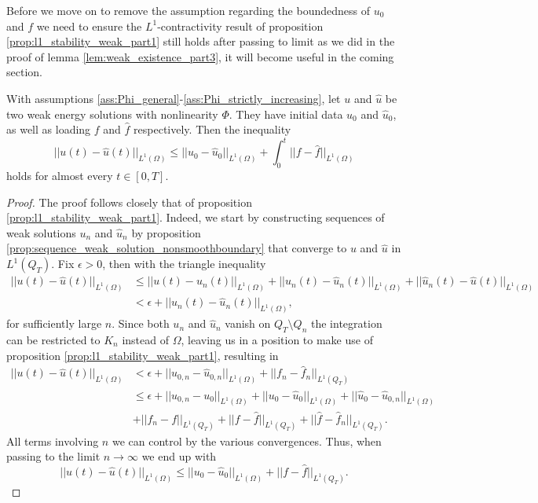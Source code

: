 \documentclass[11pt, a4paper]{article}
\begin{document}
Before we move on to remove the assumption regarding the boundedness of $u_0$ and $f$ we need to ensure the $L^1$-contractivity result of proposition \ref{prop:l1_stability_weak_part1} still holds after passing to limit as we did in the proof of lemma \ref{lem:weak_existence_part3}, it will become useful in the coming section.

\begin{proposition}
\label{prop:l1_stability_weak_part2}
With assumptions \ref{ass:Phi_general}-\ref{ass:Phi_strictly_increasing},  let $u$ and $\hat{u}$ be two weak energy solutions with nonlinearity $\Phi$. They have initial data $u_0$ and $\hat{u}_0$, as well as loading $f$ and $\hat{f}$ respectively. Then the inequality
\begin{equation}
||u(t) - \hat{u}(t)||_{L^1(\Omega)} \leq ||u_0 - \hat{u}_0||_{L^1(\Omega)} + \int_0^t||f-\hat{f}||_{L^1(\Omega)}
\end{equation}
holds for almost every $t\in [0,T]$.
\end{proposition}

\begin{proof}
The proof follows closely that of proposition \ref{prop:l1_stability_weak_part1}. Indeed, we start by constructing sequences of weak solutions $u_n$ and $\hat{u}_n$ by proposition \ref{prop:sequence_weak_solution_nonsmoothboundary} that converge to $u$ and $\hat{u}$ in $L^1(Q_T)$. Fix $\epsilon > 0$, then with the triangle inequality
\begin{align*}
||u(t) - \hat{u}(t)||_{L^1(\Omega)} &\leq ||u(t) - u_n(t)||_{L^1(\Omega)} + ||u_n(t) - \hat{u}_n(t)||_{L^1(\Omega)} + ||\hat{u}_n(t) - \hat{u}(t)||_{L^1(\Omega)} \\
&< \epsilon + ||u_n(t) - \hat{u}_n(t)||_{L^1(\Omega)},
\end{align*}
for sufficiently large $n$. Since both $u_n$ and $\hat{u}_n$ vanish on $Q_T\setminus Q_n$ the integration can be restricted to $K_n$ instead of $\Omega$, leaving us in a position to make use of proposition \ref{prop:l1_stability_weak_part1}, resulting in
\begin{align*}
||u(t) - \hat{u}(t)||_{L^1(\Omega)} &< \epsilon + ||u_{0,n} - \hat{u}_{0,n}||_{L^1(\Omega)} + ||f_n - \hat{f}_n||_{L^1(Q_T)} \\
&\leq \epsilon + ||u_{0,n} - u_0||_{L^1(\Omega)} + ||u_0 - \hat{u}_0||_{L^1(\Omega)} + ||\hat{u}_0 - \hat{u}_{0,n}||_{L^1(\Omega)} \\
&+ ||f_n - f||_{L^1(Q_T)} + ||f - \hat{f}||_{L^1(Q_T)} + ||\hat{f} - \hat{f}_n||_{L^1(Q_T)}.
\end{align*}
All terms involving $n$ we can control by the various convergences. Thus, when passing to the limit $n \to \infty$ we end up with
\begin{equation}
||u(t) - \hat{u}(t)||_{L^1(\Omega)} \leq ||u_0 - \hat{u}_0||_{L^1(\Omega)} + ||f - \hat{f}||_{L^1(Q_T)}.
\end{equation}

\end{proof}
\end{document}
